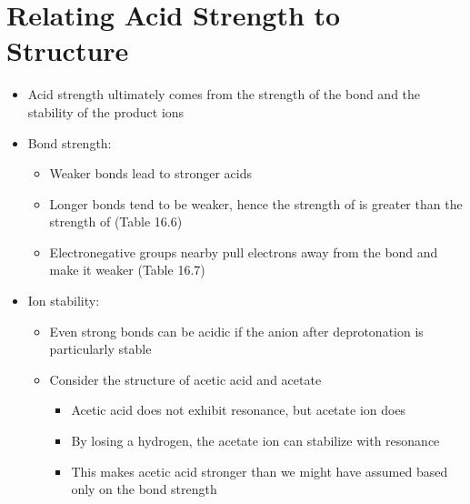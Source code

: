 \documentclass[12pt, openany, letterpaper]{memoir}
\begin{document}
\section{Relating Acid Strength to Structure}
\begin{itemize}
	\item Acid strength ultimately comes from the strength of the  bond and the stability of the product ions
	\item Bond strength:
	\begin{itemize}
		\item Weaker  bonds lead to stronger acids
		\item Longer bonds tend to be weaker, hence the strength of  is greater than the strength of  (Table 16.6)
		\item Electronegative groups nearby pull electrons away from the  bond and make it weaker (Table 16.7)
	\end{itemize}
	\item Ion stability:
	\begin{itemize}
		\item Even strong  bonds can be acidic if the anion after deprotonation is particularly stable
		\item Consider the structure of acetic acid and acetate
		\begin{itemize}
			\item Acetic acid does not exhibit resonance, but acetate ion does
			\item By losing a hydrogen, the acetate ion can stabilize with resonance
			\item This makes acetic acid stronger than we might have assumed based only on the  bond strength
		\end{itemize}
	\end{itemize}
\end{itemize}
\end{document}
